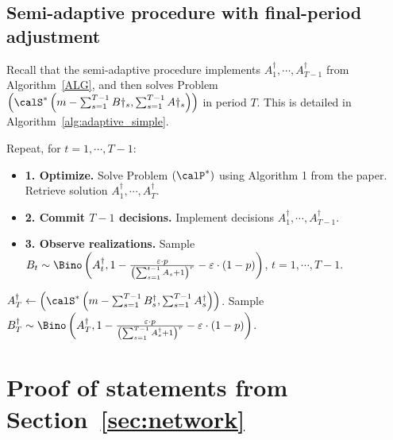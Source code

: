 \documentclass[blindrev]{informs3noheader}
\begin{document}
\subsection{Semi-adaptive procedure with final-period adjustment}

Recall that the semi-adaptive procedure implements $A^\dagger_1,\cdots,A^\dagger_{T-1}$ from Algorithm~\ref{ALG}, and then solves Problem $\left(\calS^*\left(m-\sum_{s=1}^{T-1}B\dagger_s,\sum_{s=1}^{T-1} A\dagger_s\right)\right)$ in period $T$. This is detailed in Algorithm~\ref{alg:adaptive_simple}.

\begin{algorithm} [h!]
\caption{Semi-adaptive algorithm to solve Problem $(\calP^*)$.}\small
\label{alg:adaptive_simple}
\begin{algorithmic}
\item Repeat, for $t=1,\cdots,T-1$:
\begin{itemize}
    \item[] \textbf{1. Optimize.} Solve Problem $(\calP^*)$ using Algorithm 1 from the paper. Retrieve solution $A^\dagger_1,\cdots,A^\dagger_{T}$.
    \item[] \textbf{2. Commit $T-1$ decisions.} Implement decisions $A^\dagger_1,\cdots,A^\dagger_{T-1}$.
    \item[] \textbf{3. Observe realizations.} Sample $B_t\sim \Bino\left(A^\dagger_t, 1- \frac{\varepsilon\cdot p}{\left(\sum_{s=1}^{t-1} A_s +1\right)^r}-\varepsilon\cdot(1-p)\right)$, $t=1,\cdots,T-1$.
\end{itemize}
\item $A^\dagger_T\gets\left(\calS^*\left(m-\sum_{s=1}^{T-1}B^\dagger_s,\sum_{s=1}^{T-1} A^\dagger_s\right)\right)$. Sample $B^\dagger_T\sim \Bino\left(A^\dagger_T, 1- \frac{\varepsilon\cdot p}{\left(\sum_{s=1}^{T-1} A^\dagger_s +1\right)^r}-\varepsilon\cdot(1-p)\right)$.
\end{algorithmic}
\end{algorithm}

\section{Proof of statements from Section~\ref{sec:network}}
\label{app:network}
\end{document}
